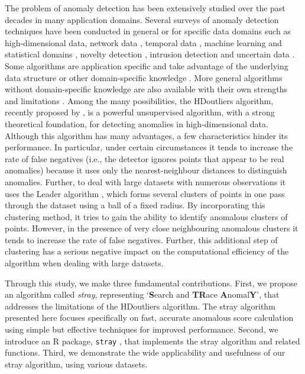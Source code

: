 \documentclass[11pt,a4paper,]{article}
\theoremstyle{definition}
\theoremstyle{definition}
\theoremstyle{definition}
\theoremstyle{remark}
\begin{document}
The problem of anomaly detection has been extensively studied over the past decades in many application domains. Several surveys of anomaly detection techniques have been conducted in general \autocite{Chandola2009wq,Aggarwal2017cj} or for specific data domains such as high-dimensional data, network data \autocite{shahid2015characteristics}, temporal data \autocite{gupta2014outliersurvey}, machine learning and statistical domains \autocite{hodge2004survey}, novelty detection \autocite{pimentel2014review}, intrusion detection \autocite{sabahi2008intrusion} and uncertain data \autocite{aggarwal2008outlier}. Some algorithms are application specific and take advantage of the underlying data structure or other domain-specific knowledge \autocite{talagala2019feature}. More general algorithms without domain-specific knowledge are also available with their own strengths and limitations \autocite{breunig2000lof,tang2002enhancing,jin2006ranking,gao2011rkof}. Among the many possibilities, the HDoutliers algorithm, recently proposed by \textcite{wilkinson2017visualizing}, is a powerful unsupervised algorithm, with a strong theoretical foundation, for detecting anomalies in high-dimensional data. Although this algorithm has many advantages, a few characteristics hinder its performance. In particular, under certain circumstances it tends to increase the rate of false negatives (i.e., the detector ignores points that appear to be real anomalies) because it uses only the nearest-neighbour distances to distinguish anomalies. Further, to deal with large datasets with numerous observations it uses the Leader algorithm \autocite{hartigan1975clustering}, which forms several clusters of points in one pass through the dataset using a ball of a fixed radius. By incorporating this clustering method, it tries to gain the ability to identify anomalous clusters of points. However, in the presence of very close neighbouring anomalous clusters it tends to increase the rate of false negatives. Further, this additional step of clustering has a serious negative impact on the computational efficiency of the algorithm when dealing with large datasets.

Through this study, we make three fundamental contributions. First, we propose an algorithm called \emph{stray}, representing `\textbf{S}earch and \textbf{TR}ace \textbf{A}nomal\textbf{Y}', that addresses the limitations of the HDoutliers algorithm. The stray algorithm presented here focuses specifically on fast, accurate anomalous score calculation using simple but effective techniques for improved performance. Second, we introduce an R \autocite{Rsoftware2019} package, \texttt{stray} \autocite{strayR2019}, that implements the stray algorithm and related functions. Third, we demonstrate the wide applicability and usefulness of our stray algorithm, using various datasets.
\end{document}
